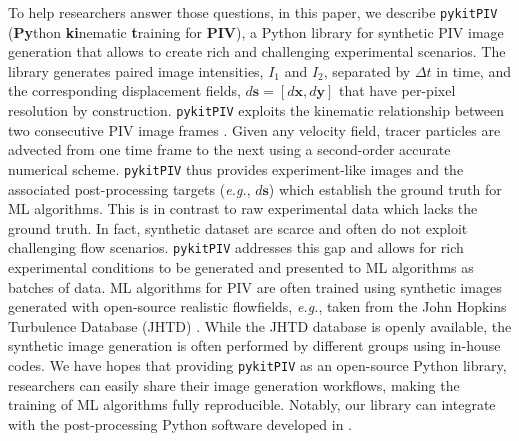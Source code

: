 \documentclass[a4paper,fleqn]{cas-dc}
\begin{document}
To help researchers answer those questions, in this paper, we describe \texttt{pykitPIV} (\textbf{Py}thon \textbf{ki}nematic \textbf{t}raining for \textbf{PIV}), a Python library for synthetic PIV image generation that allows to create rich and challenging experimental scenarios. The library generates paired image intensities, $I_1$ and $I_2$, separated by $\Delta t$ in time, and the corresponding displacement fields, $d\mathbf{s} = [d \mathbf{x}, d\mathbf{y}]$ that have per-pixel resolution by construction. \texttt{pykitPIV} exploits the kinematic relationship between two consecutive PIV image frames \cite{manickathan2022kinematic}. Given any velocity field, tracer particles are advected from one time frame to the next using a second-order accurate numerical scheme. \texttt{pykitPIV} thus provides experiment-like images and the associated post-processing targets (\textit{e.g.}, $d\mathbf{s}$) which establish the ground truth for ML algorithms. This is in contrast to raw experimental data which lacks the ground truth. In fact, synthetic dataset are scarce and often do not exploit challenging flow scenarios. \texttt{pykitPIV} addresses this gap and allows for rich experimental conditions to be generated and presented to ML algorithms as batches of data.
ML algorithms for PIV are often trained using synthetic images generated with open-source realistic flowfields, \textit{e.g.}, taken from the John Hopkins Turbulence Database (JHTD) \cite{perlman2007data}. While the JHTD database is openly available, the synthetic image generation is often performed by different groups using in-house codes. We have hopes that providing \texttt{pykitPIV} as an open-source Python library, researchers can easily share their image generation workflows, making the training of ML algorithms fully reproducible.
Notably, our library can integrate with the post-processing Python software developed in \cite{aguilar2022dpivsoft}.
\end{document}
